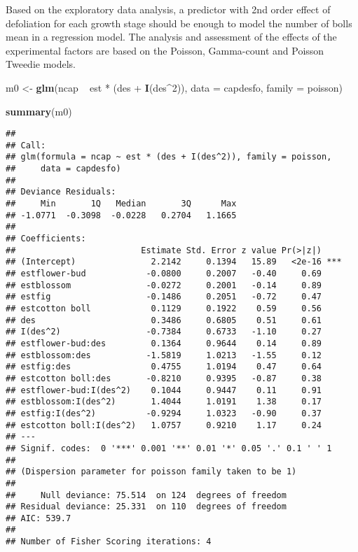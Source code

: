 \documentclass[9pt,a5paper,]{book}
\newenvironment{Shaded}{}{}
\newcommand{\KeywordTok}[1]{\textbf{{#1}}}
\newcommand{\DataTypeTok}[1]{\underline{{#1}}}
\newcommand{\DecValTok}[1]{{#1}}
\newcommand{\StringTok}[1]{{#1}}
\newcommand{\NormalTok}[1]{{#1}}
\renewenvironment{Shaded}{\color{inputcolor}}{}
\renewcommand{\DataTypeTok}[1]{{#1}}
\theoremstyle{definition}
\theoremstyle{definition}
\theoremstyle{remark}
\begin{document}
Based on the exploratory data analysis, a predictor with 2nd order
effect of defoliation for each growth stage should be enough to model
the number of bolls mean in a regression model. The analysis and
assessment of the effects of the experimental factors are based on the
Poisson, Gamma-count and Poisson Tweedie models.

\begin{Shaded}
\begin{Highlighting}[]
\NormalTok{m0 <-}\StringTok{ }\KeywordTok{glm}\NormalTok{(ncap ~}\StringTok{ }\NormalTok{est *}\StringTok{ }\NormalTok{(des +}\StringTok{ }\KeywordTok{I}\NormalTok{(des^}\DecValTok{2}\NormalTok{)),}
          \DataTypeTok{data =} \NormalTok{capdesfo,}
          \DataTypeTok{family =} \NormalTok{poisson)}

\KeywordTok{summary}\NormalTok{(m0)}
\end{Highlighting}
\end{Shaded}

\begin{verbatim}
## 
## Call:
## glm(formula = ncap ~ est * (des + I(des^2)), family = poisson, 
##     data = capdesfo)
## 
## Deviance Residuals: 
##     Min       1Q   Median       3Q      Max  
## -1.0771  -0.3098  -0.0228   0.2704   1.1665  
## 
## Coefficients:
##                         Estimate Std. Error z value Pr(>|z|)    
## (Intercept)               2.2142     0.1394   15.89   <2e-16 ***
## estflower-bud            -0.0800     0.2007   -0.40     0.69    
## estblossom               -0.0272     0.2001   -0.14     0.89    
## estfig                   -0.1486     0.2051   -0.72     0.47    
## estcotton boll            0.1129     0.1922    0.59     0.56    
## des                       0.3486     0.6805    0.51     0.61    
## I(des^2)                 -0.7384     0.6733   -1.10     0.27    
## estflower-bud:des         0.1364     0.9644    0.14     0.89    
## estblossom:des           -1.5819     1.0213   -1.55     0.12    
## estfig:des                0.4755     1.0194    0.47     0.64    
## estcotton boll:des       -0.8210     0.9395   -0.87     0.38    
## estflower-bud:I(des^2)    0.1044     0.9447    0.11     0.91    
## estblossom:I(des^2)       1.4044     1.0191    1.38     0.17    
## estfig:I(des^2)          -0.9294     1.0323   -0.90     0.37    
## estcotton boll:I(des^2)   1.0757     0.9210    1.17     0.24    
## ---
## Signif. codes:  0 '***' 0.001 '**' 0.01 '*' 0.05 '.' 0.1 ' ' 1
## 
## (Dispersion parameter for poisson family taken to be 1)
## 
##     Null deviance: 75.514  on 124  degrees of freedom
## Residual deviance: 25.331  on 110  degrees of freedom
## AIC: 539.7
## 
## Number of Fisher Scoring iterations: 4
\end{verbatim}
\end{document}
